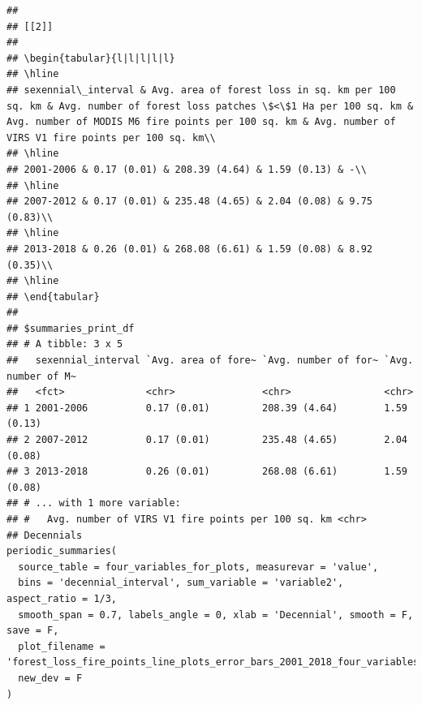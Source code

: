 \documentclass[10pt,landscape,a3paper]{article}
\begin{document}
\begin{verbatim}
## 
## [[2]]
## 
## \begin{tabular}{l|l|l|l|l}
## \hline
## sexennial\_interval & Avg. area of forest loss in sq. km per 100 sq. km & Avg. number of forest loss patches \$<\$1 Ha per 100 sq. km & Avg. number of MODIS M6 fire points per 100 sq. km & Avg. number of VIRS V1 fire points per 100 sq. km\\
## \hline
## 2001-2006 & 0.17 (0.01) & 208.39 (4.64) & 1.59 (0.13) & -\\
## \hline
## 2007-2012 & 0.17 (0.01) & 235.48 (4.65) & 2.04 (0.08) & 9.75 (0.83)\\
## \hline
## 2013-2018 & 0.26 (0.01) & 268.08 (6.61) & 1.59 (0.08) & 8.92 (0.35)\\
## \hline
## \end{tabular}
## 
## $summaries_print_df
## # A tibble: 3 x 5
##   sexennial_interval `Avg. area of fore~ `Avg. number of for~ `Avg. number of M~
##   <fct>              <chr>               <chr>                <chr>             
## 1 2001-2006          0.17 (0.01)         208.39 (4.64)        1.59 (0.13)       
## 2 2007-2012          0.17 (0.01)         235.48 (4.65)        2.04 (0.08)       
## 3 2013-2018          0.26 (0.01)         268.08 (6.61)        1.59 (0.08)       
## # ... with 1 more variable:
## #   Avg. number of VIRS V1 fire points per 100 sq. km <chr>
## Decennials
periodic_summaries(
  source_table = four_variables_for_plots, measurevar = 'value',
  bins = 'decennial_interval', sum_variable = 'variable2', aspect_ratio = 1/3,
  smooth_span = 0.7, labels_angle = 0, xlab = 'Decennial', smooth = F, save = F,
  plot_filename = 'forest_loss_fire_points_line_plots_error_bars_2001_2018_four_variables_decennial.jpg',
  new_dev = F
)
\end{verbatim}
\end{document}
